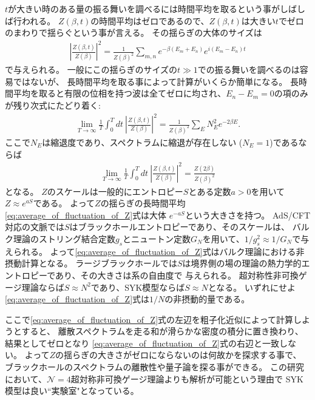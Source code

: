 $t$が大きい時のある量の振る舞いを調べるには時間平均を取るという事がしばしば行われる。
$Z(\beta, t)$の時間平均はゼロであるので、$Z(\beta, t)$は大きい$t$でゼロのまわりで揺らぐという事が言える。
その揺らぎの大体のサイズは
\begin{align}
	\left|\frac{Z(\beta, t)}{Z(\beta)}\right|^2
	= \frac{1}{Z(\beta)^2}\sum_{m,n}e^{-\beta(E_m + E_n)}e^{i(E_m - E_n)t}
\end{align}
で与えられる。
一般にこの揺らぎのサイズの$t \gg 1$での振る舞いを調べるのは容易ではないが、
長時間平均を取る事によって計算がいくらか簡単になる。
長時間平均を取ると有限の位相を持つ波は全てゼロに均され、$E_n-E_m = 0$の項のみが残り次式にたどり着く:
\begin{align}
	\lim_{T\to\infty}\frac{1}{T}\int_0^Tdt\ \left|\frac{Z(\beta, t)}{Z(\beta)}\right|^2
	= \frac{1}{Z(\beta)^2}\sum_E N_E^2e^{-2\beta E}.
\end{align}
ここで$N_E$は縮退度であり、スペクトラムに縮退が存在しない ($N_E = 1$)であるならば
\begin{align}
	\lim_{T\to\infty}\frac{1}{T}\int_0^Tdt\ \left|\frac{Z(\beta, t)}{Z(\beta)}\right|^2
	= \frac{Z(2\beta)}{Z(\beta)^2}
	\label{eq:average_of_fluctuation_of_Z}
\end{align} 
となる。
$Z$のスケールは一般的にエントロピー$S$とある定数$a > 0$を用いて$Z \approx e^{aS}$である。
よって$Z$の揺らぎの長時間平均\eqref{eq:average_of_fluctuation_of_Z}式は大体
$e^{-aS}$という大きさを持つ。
AdS/CFT対応の文脈では$S$はブラックホールエントロピーであり、そのスケールは、
バルク理論のストリング結合定数$g_s$とニュートン定数$G_N$を用いて、$1/g_s^2 \approx 1/G_N$で与えられる。
よって\eqref{eq:average_of_fluctuation_of_Z}式はバルク理論における非摂動計算となる。
ラージブラックホールでは$S$は境界側の場の理論の熱力学的エントロピーであり、その大きさは系の自由度で
与えられる。
超対称性非可換ゲージ理論ならば$S\approx N^2$であり、SYK模型ならば$S\approx N$となる。
いずれにせよ\eqref{eq:average_of_fluctuation_of_Z}式は$1/N$の非摂動的量である。

ここで\eqref{eq:average_of_fluctuation_of_Z}式の左辺を粗子化近似によって計算しようとすると、
離散スペクトラムを走る和が滑らかな密度の積分に置き換わり、結果としてゼロとなり
\eqref{eq:average_of_fluctuation_of_Z}式の右辺と一致しない。
よって$Z$の揺らぎの大きさがゼロにならないのは何故かを探求する事で、
ブラックホールのスペクトラムの離散性や量子論を探る事ができる。
この研究において、$\mathcal{N}=4$超対称非可換ゲージ理論よりも解析が可能という理由で
SYK模型は良い``実験室"となっている。

